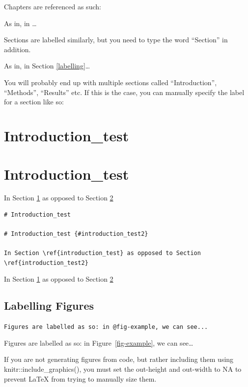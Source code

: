 \documentclass[../main.tex]{subfiles}
\begin{document}
Chapters are referenced as such:


As in, in \ldots{}

Sections are labelled similarly, but you need to type the word
``Section'' in addition.

As in, in Section \ref{labelling}\ldots{}

You will probably end up with multiple sections called ``Introduction'',
``Methods'', ``Results'' etc. If this is the case, you can manually
specify the label for a section like so:

\section{Introduction\_test}\label{introduction_test}

\section{Introduction\_test}\label{introduction_test2}

In Section \ref{introduction_test} as opposed to Section
\ref{introduction_test2}

\begin{verbatim}
# Introduction_test 

# Introduction_test {#introduction_test2}

In Section \ref{introduction_test} as opposed to Section \ref{introduction_test2}
\end{verbatim}

In Section \ref{introduction_test} as opposed to Section
\ref{introduction_test2}

\subsection{Labelling Figures}\label{labelling-figures}

\texttt{Figures\ are\ labelled\ as\ so:\ in\ @fig-example,\ we\ can\ see...}

Figures are labelled as so: in Figure~\ref{fig-example}, we can
see\ldots{}

If you are not generating figures from code, but rather including them
using knitr::include\_graphics(), you must set the out-height and
out-width to NA to prevent LaTeX from trying to manually size them.
\end{document}

